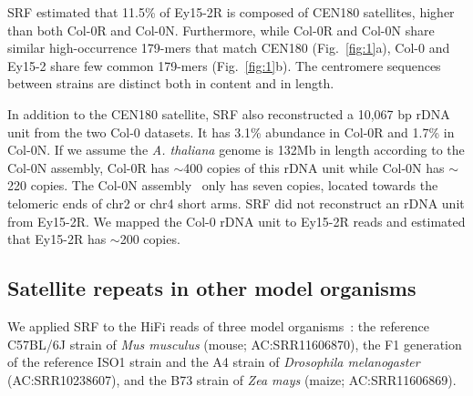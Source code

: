 \documentclass{bioinfo}
\begin{document}
SRF estimated that 11.5\% of Ey15-2R is composed of CEN180 satellites, higher
than both Col-0R and Col-0N. Furthermore, while Col-0R and Col-0N share similar
high-occurrence 179-mers that match CEN180 (Fig.~\ref{fig:1}a), Col-0 and
Ey15-2 share few common 179-mers (Fig.~\ref{fig:1}b). The centromere sequences
between strains are distinct both in content and in length.


In addition to the CEN180 satellite, SRF also reconstructed a 10,067 bp rDNA
unit from the two Col-0 datasets. It has 3.1\% abundance in Col-0R and 1.7\% in
Col-0N. If we assume the \emph{A. thaliana} genome is 132Mb in length
according to the Col-0N assembly, Col-0R has $\sim$400 copies of this rDNA unit
while Col-0N has $\sim$220 copies. The Col-0N assembly~\citep{Naish:2021aa} only has seven copies,
located towards the telomeric ends of chr2 or chr4 short arms.  SRF did not
reconstruct an rDNA unit from Ey15-2R. We mapped the Col-0 rDNA unit to Ey15-2R
reads and estimated that Ey15-2R has $\sim$200 copies.

\subsection{Satellite repeats in other model organisms}

We applied SRF to the HiFi reads of three model organisms~\citep{Hon:2020aa}: the
reference C57BL/6J strain of \emph{Mus musculus} (mouse; AC:SRR11606870), the
F1 generation of the reference ISO1 strain and the A4 strain of
\emph{Drosophila melanogaster} (AC:SRR10238607), and the B73 strain of \emph{Zea
mays} (maize; AC:SRR11606869).
\end{document}
